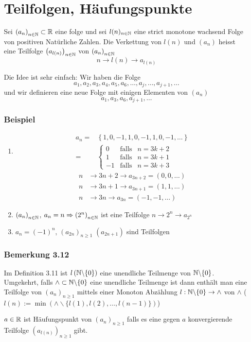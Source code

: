 \section{Teilfolgen, Häufungspunkte}
\begin{definition}{3.11}
Sei $\left( a_n\right)_{n\in\mathbb{N}}\subset\mathbb{R}$ eine folge und sei $l(n)_{n\in\mathbb{N}}$ eine strict monotone wachsend Folge von positiven Natürliche Zahlen. Die Verkettung von $l(n)$ und $\left( a_n\right)$ heisst eine Teilfolge $\left( a_{l(n)}\right)_{n\in\mathbb{N}}$ von $\left( a_{n}\right)_{n\in\mathbb{N}}$ 
\[n\to l(n)\to a_{l(n)}\]
\end{definition}
Die Idee ist sehr einfach: Wir haben die Folge \[a_1,a_2,a_3,a_4,a_5,a_6,\dots,a_j,\dots,a_{j+1},\dots \]
und wir definieren eine neue Folge mit einigen Elementen von $\left( a_n\right)$ 
\[a_1,a_3,a_6,a_{j+1},\dots \]

\subsubsection*{Beispiel}
\begin{enumerate}
\item \begin{align*}
{a_n} =&\left\{ {1,0, - 1,1,0, - 1,1,0, - 1, \ldots } \right\}\\
 =&\left\{ {\begin{array}{*{20}{c}}
0&{{\text{falls}}}&{n = 3k + 2}\\
1&{{\text{falls}}}&{n = 3k + 1}\\
{ - 1}&{{\text{falls}}}&{n = 3k + 3}
\end{array}} \right.
\end{align*}
\begin{align*}
n&\to 3n + 2 \to {a_{3n + 2}} = \left( {0,0, \ldots } \right)\\
n&\to 3n + 1 \to {a_{3n + 1}} = \left( {1,1, \ldots } \right)\\
n&\to 3n \to {a_{3n}} = \left( { - 1, - 1, \ldots } \right)
\end{align*}
\item $\left( a_n\right)_{n\in\mathbb{N}}$, $a_n=n\Rightarrow \left( 2^n\right)_{n\in\mathbb{N}}$ ist eine Teilfolge $n\to 2^n\to a_{2^n}$
\item $a_n=\left( -1\right)^n$, $\left( a_{2n}\right)_{n\geq 1}$ $\left( a_{2n+1}\right)$ sind Teilfolgen
\end{enumerate}

\subsubsection*{Bemerkung 3.12}
Im Definition 3.11 ist $l\left( \mathbb{N}\backslash\{ 0\}\right)$ eine unendliche Teilmenge von $\mathbb{N}\backslash\{ 0\}$. Umgekehrt, falls $\wedge\subset\mathbb{N}\backslash\{ 0\}$ eine unendliche Teilmenge ist dann enthält man eine Teilfolge von $\left( a_n\right)_{n\geq 1}$ mittels einer Monoton Abzählung $l:\mathbb{N}\backslash\{ 0\}\to\wedge$ von $\wedge$ ($l(n):=\min\left( \wedge \backslash\{ l(1),l(2),\dots ,l(n-1)\}\right)$)
\begin{definition}{3.13}
$a\in\mathbb{R}$ ist Häufungspunkt von $\left( a_n\right)_{n\geq 1}$ falls es eine gegen $a$ konvergierende Teilfolge $\left( a_{l(n)}\right)_{n\geq 1}$ gibt. 
\end{definition}
